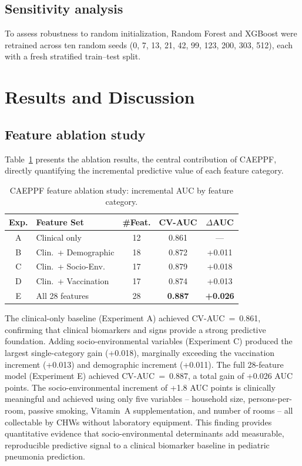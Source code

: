 \documentclass[3p,times,twocolumn]{elsarticle}
\begin{document}
\subsection{Sensitivity analysis}
To assess robustness to random initialization, Random Forest and XGBoost were retrained across ten random seeds (0, 7, 13, 21, 42, 99, 123, 200, 303, 512), each with a fresh stratified train--test split.

\section{Results and Discussion}

\subsection{Feature ablation study}
Table~\ref{tab:ablation} presents the ablation results, the central contribution of CAEPPF, directly quantifying the incremental predictive value of each feature category.

\begin{table}[htbp]
\centering
\caption{CAEPPF feature ablation study: incremental AUC by feature category.}
\label{tab:ablation}
\footnotesize
\begin{tabular}{@{}clccc@{}}
\toprule
Exp. & Feature Set & \#Feat. & CV-AUC & $\Delta$AUC \\
\midrule
A & Clinical only & 12 & 0.861 & --- \\
B & Clin.\ + Demographic & 18 & 0.872 & +0.011 \\
C & Clin.\ + Socio-Env. & 17 & 0.879 & +0.018 \\
D & Clin.\ + Vaccination & 17 & 0.874 & +0.013 \\
E & All 28 features & 28 & \textbf{0.887} & \textbf{+0.026} \\
\bottomrule
\end{tabular}
\end{table}

The clinical-only baseline (Experiment A) achieved CV-AUC~=~0.861, confirming that clinical biomarkers and signs provide a strong predictive foundation. Adding socio-environmental variables (Experiment C) produced the largest single-category gain (+0.018), marginally exceeding the vaccination increment (+0.013) and demographic increment (+0.011). The full 28-feature model (Experiment E) achieved CV-AUC~=~0.887, a total gain of +0.026 AUC points. The socio-environmental increment of +1.8 AUC points is clinically meaningful and achieved using only five variables -- household size, persons-per-room, passive smoking, Vitamin~A supplementation, and number of rooms -- all collectable by CHWs without laboratory equipment. This finding provides quantitative evidence that socio-environmental determinants add measurable, reproducible predictive signal to a clinical biomarker baseline in pediatric pneumonia prediction.
\end{document}
